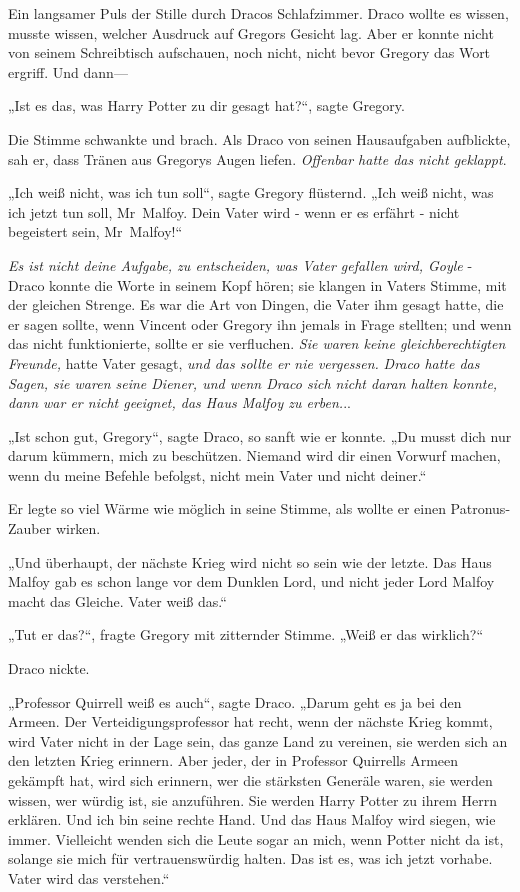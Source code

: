 {Ein langsamer Puls der Stille durch Dracos Schlafzimmer. Draco wollte es wissen, musste wissen, welcher Ausdruck auf Gregors Gesicht lag. Aber er konnte nicht von seinem Schreibtisch aufschauen, noch nicht, nicht bevor Gregory das Wort ergriff. Und dann—

„Ist es das, was Harry Potter zu dir gesagt hat?“, sagte Gregory.

Die Stimme schwankte und brach. Als Draco von seinen Hausaufgaben aufblickte, sah er, dass Tränen aus Gregorys Augen liefen. \emph{Offenbar hatte das nicht geklappt}.

„Ich weiß nicht, was ich tun soll“, sagte Gregory flüsternd. „Ich weiß nicht, was ich jetzt tun soll, Mr~Malfoy. Dein Vater wird - wenn er es erfährt - nicht begeistert sein, Mr~Malfoy!“

\emph{Es ist nicht deine Aufgabe, zu entscheiden, was Vater gefallen wird, Goyle} - Draco konnte die Worte in seinem Kopf hören; sie klangen in Vaters Stimme, mit der gleichen Strenge. Es war die Art von Dingen, die Vater ihm gesagt hatte, die er sagen sollte, wenn Vincent oder Gregory ihn jemals in Frage stellten; und wenn das nicht funktionierte, sollte er sie verfluchen. \emph{Sie waren keine gleichberechtigten Freunde,} hatte Vater gesagt, \emph{und das sollte er nie vergessen.} \emph{Draco hatte das Sagen, sie waren seine Diener, und wenn Draco sich nicht daran halten konnte, dann war er nicht geeignet, das Haus Malfoy zu erben.}..

„Ist schon gut, Gregory“, sagte Draco, so sanft wie er konnte. „Du musst dich nur darum kümmern, mich zu beschützen. Niemand wird dir einen Vorwurf machen, wenn du meine Befehle befolgst, nicht mein Vater und nicht deiner.“

Er legte so viel Wärme wie möglich in seine Stimme, als wollte er einen Patronus-Zauber wirken.

„Und überhaupt, der nächste Krieg wird nicht so sein wie der letzte. Das Haus Malfoy gab es schon lange vor dem Dunklen Lord, und nicht jeder Lord Malfoy macht das Gleiche. Vater weiß das.“

„Tut er das?“, fragte Gregory mit zitternder Stimme. „Weiß er das wirklich?“

Draco nickte.

„Professor Quirrell weiß es auch“, sagte Draco. „Darum geht es ja bei den Armeen. Der Verteidigungsprofessor hat recht, wenn der nächste Krieg kommt, wird Vater nicht in der Lage sein, das ganze Land zu vereinen, sie werden sich an den letzten Krieg erinnern. Aber jeder, der in Professor Quirrells Armeen gekämpft hat, wird sich erinnern, wer die stärksten Generäle waren, sie werden wissen, wer würdig ist, sie anzuführen. Sie werden Harry Potter zu ihrem Herrn erklären. Und ich bin seine rechte Hand. Und das Haus Malfoy wird siegen, wie immer. Vielleicht wenden sich die Leute sogar an mich, wenn Potter nicht da ist, solange sie mich für vertrauenswürdig halten. Das ist es, was ich jetzt vorhabe. Vater wird das verstehen.“

}
